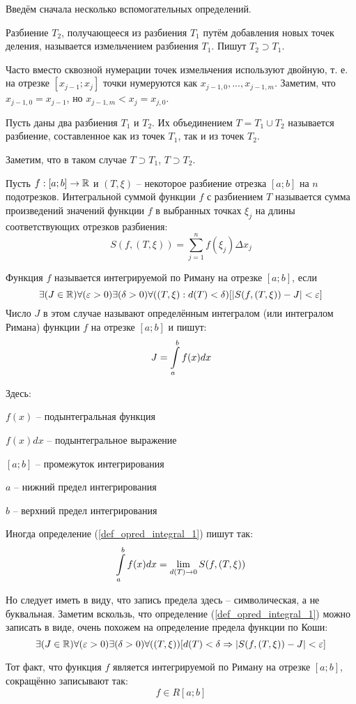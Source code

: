 Введём сначала несколько вспомогательных определений.

\opred
Разбиение $T_2$, получающееся из разбиения $T_1$ путём добавления новых точек деления, называется измельчением разбиения $T_1$.
Пишут $T_2 \supset T_1$.

Часто вместо сквозной нумерации точек измельчения используют двойную, т. е. на отрезке $[x_{j-1};x_j]$ точки нумеруются как $x_{j-1,0}, ..., x_{j-1,m}$.
Заметим, что $x_{j-1,0}=x_{j-1}$, но $x_{j-1,m}<x_j=x_{j,0}$.

\opred
Пусть даны два разбиения $T_1$ и $T_2$.
Их объединением $T=T_1 \cup T_2$ называется разбиение, составленное как из точек $T_1$, так и из точек $T_2$.

Заметим, что в таком случае $T\supset T_1$, $T\supset T_2$.

\opred
Пусть $f:[a;b]\to \mathbb{R}$ и $(T, \xi)$ -- некоторое разбиение отрезка $[a;b]$ на $n$ подотрезков.
Интегральной суммой функции $f$ с разбиением $T$ называется сумма произведений значений функции $f$ в выбранных точках $\xi_j$ на длины соответствующих отрезков разбиения:
$$S(f,(T,\xi))=\sum_{j=1}^n f(\xi_j)\Delta x_j$$

\opred
Функция $f$ называется интегрируемой по Риману на отрезке $[a;b]$, если
\begin{equation}\label{def_opred_integral_1}
\exists(J\in\mathbb{R})\forall(\varepsilon>0)\exists(\delta>0)\forall((T,\xi):d(T)<\delta)[|S(f,(T,\xi))-J|<\varepsilon]
\end{equation}
Число $J$ в этом случае называют определённым интегралом (или интегралом Римана) функции $f$ на отрезке $[a;b]$ и пишут:
$$
J=\int\limits_a^b f(x) dx
$$

Здесь:

$f(x)$ -- подынтегральная функция

$f(x)dx$ -- подынтегральное выражение

$[a;b]$ -- промежуток интегрирования

$a$ -- нижний предел интегрирования

$b$ -- верхний предел интегрирования

Иногда определение (\ref{def_opred_integral_1}) пишут так:
$$
\int\limits_a^b f(x) dx = \lim_{d(T)\to 0} S(f,(T,\xi))
$$

Но следует иметь в виду, что запись предела здесь -- символическая, а не буквальная.
Заметим вскользь, что определение (\ref{def_opred_integral_1}) можно записать в виде, очень похожем на определение предела функции по Коши:
$$\exists(J\in\mathbb{R})\forall(\varepsilon>0)\exists(\delta>0)\forall((T,\xi))[d(T)<\delta \Rightarrow |S(f,(T,\xi))-J|<\varepsilon]
$$

Тот факт, что функция $f$ является интегрируемой по Риману на отрезке $[a;b]$, сокращённо записывают так:
$$f\in R[a;b]$$

